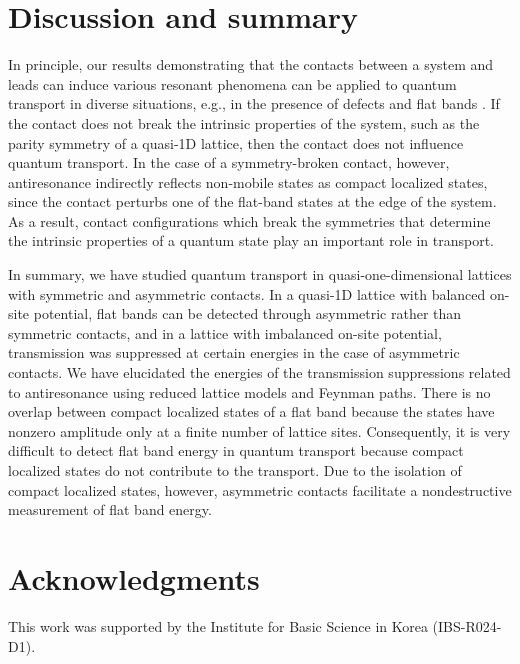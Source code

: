 \documentclass[twocolumn,showpacs,epsfig,pre]{revtex4}
\begin{document}
\section{Discussion and summary}

In principle, our results demonstrating that the contacts between a system and leads can induce various resonant phenomena can be applied to quantum transport in diverse situations, e.g., in the presence of defects and flat bands \cite{Wan02, Ore03, Ore03b, Bao05, Lop14}. If the contact does not break the intrinsic properties of the system, such as the parity symmetry of a quasi-1D lattice, then the contact does not influence quantum transport. In the case of a symmetry-broken contact, however, antiresonance indirectly reflects non-mobile states as compact localized states, since the contact perturbs one of the flat-band states at the edge of the system. As a result, contact configurations which break the symmetries that determine the intrinsic properties of a quantum state play an important role in transport.

In summary, we have studied quantum transport in quasi-one-dimensional lattices with symmetric and asymmetric contacts. In a quasi-1D lattice with balanced on-site potential, flat bands can be detected through asymmetric rather than symmetric contacts, and in a lattice with imbalanced on-site potential, transmission was suppressed at certain energies in the case of asymmetric contacts. We have elucidated the energies of the transmission suppressions related to antiresonance using reduced lattice models and Feynman paths. 
There is no overlap between compact localized states of a flat band because the states have nonzero amplitude only at a finite number of lattice sites. Consequently, it is very difficult to detect flat band energy in quantum transport because compact localized states do not contribute to the transport. Due to the isolation of compact localized states, however, asymmetric contacts facilitate a nondestructive measurement of flat band energy.

\section*{Acknowledgments}
This work was supported by the Institute for Basic Science in Korea (IBS-R024-D1).
\end{document}

